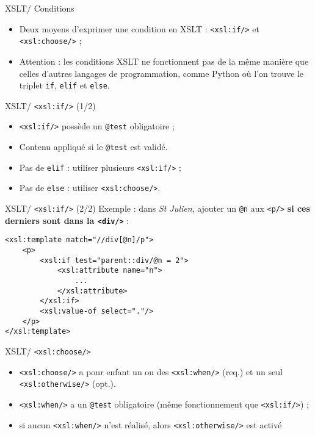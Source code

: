 \documentclass{beamer}
\begin{document}
    \begin{frame}{XSLT/ Conditions}
        \Large
        \begin{itemize}
            \item Deux moyens d'exprimer une condition en XSLT : \texttt{<xsl:if/>} et \texttt{<xsl:choose/>} ;
            \bigskip
            \item Attention : les conditions XSLT ne fonctionnent pas de la même manière que celles d'autres langages de programmation, comme Python où l'on trouve le triplet \texttt{if}, \texttt{elif} et \texttt{else}.
        \end{itemize}
    \end{frame}

    \begin{frame}{XSLT/ \texttt{<xsl:if/>} (1/2)}
        \Large
        \begin{itemize}
            \item \texttt{<xsl:if/>} possède un \texttt{@test} obligatoire ;
            \item Contenu appliqué si le \texttt{@test} est validé.
            \bigskip
            \item Pas de \texttt{elif} : utiliser plusieurs \texttt{<xsl:if/>} ;
            \item Pas de \texttt{else} : utiliser \texttt{<xsl:choose/>}.
        \end{itemize}
    \end{frame}

    \begin{frame}[fragile]{XSLT/ \texttt{<xsl:if/>} (2/2)}
        \Large
        Exemple : dans \textit{St Julien}, ajouter un \texttt{@n} aux \texttt{<p/>} \textbf{si ces derniers sont dans la \texttt{<div/>} } :
        \normalsize
        \begin{verbatim}
<xsl:template match="//div[@n]/p">
    <p>
        <xsl:if test="parent::div/@n = 2">
            <xsl:attribute name="n">
                ...
            </xsl:attribute>
        </xsl:if>
        <xsl:value-of select="."/>
    </p>
</xsl:template>
        \end{verbatim}
    \end{frame}

    \begin{frame}{XSLT/ \texttt{<xsl:choose/>}}
        \Large
        \begin{itemize}
            \item \texttt{<xsl:choose/>} a pour enfant un ou des \texttt{<xsl:when/>} (req.) et un seul \texttt{<xsl:otherwise/>} (opt.).
            \bigskip
            \item \texttt{<xsl:when/>} a un \texttt{@test} obligatoire (même fonctionnement que \texttt{<xsl:if/>}) ;
            \bigskip
            \item si aucun \texttt{<xsl:when/>} n'est réalisé, alors \texttt{<xsl:otherwise/>} est activé
        \end{itemize}
    \end{frame}
\end{document}
